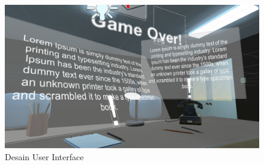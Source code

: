 \begin{figure}[htbp]
\centering
\includegraphics[scale=0.3]{Gambar/desain-pop-up.PNG}
\caption{Desain User Interface}
\label{fig:desain_pop_up}
\end{figure}
